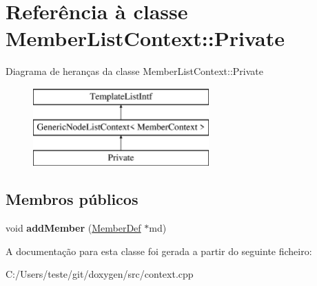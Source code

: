 \hypertarget{class_member_list_context_1_1_private}{\section{Referência à classe Member\-List\-Context\-:\-:Private}
\label{class_member_list_context_1_1_private}
}
Diagrama de heranças da classe Member\-List\-Context\-:\-:Private\begin{figure}[H]
\begin{center}
\leavevmode
\includegraphics[height=3.000000cm]{class_member_list_context_1_1_private}
\end{center}
\end{figure}
\subsection*{Membros públicos}
\begin{DoxyCompactItemize}
\item 
\hypertarget{class_member_list_context_1_1_private_a37d9fd4f82ffb8c51abbc9a0ca3e73c3}{void {\bfseries add\-Member} (\hyperlink{class_member_def}{Member\-Def} $\ast$md)}\label{class_member_list_context_1_1_private_a37d9fd4f82ffb8c51abbc9a0ca3e73c3}

\end{DoxyCompactItemize}


A documentação para esta classe foi gerada a partir do seguinte ficheiro\-:\begin{DoxyCompactItemize}
\item 
C\-:/\-Users/teste/git/doxygen/src/context.\-cpp\end{DoxyCompactItemize}

